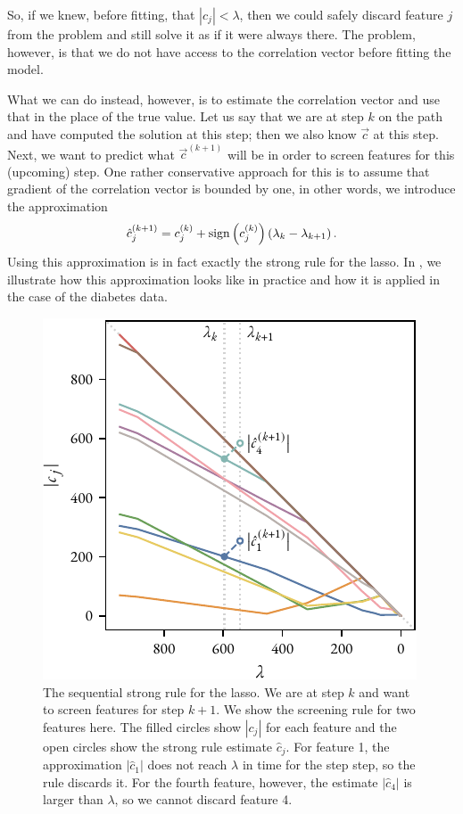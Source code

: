 So, if we knew, before fitting, that \(|c_j| < \lambda\), then we could safely discard feature \(j\) from the problem and still solve it as if it were always there. The problem, however, is that we do not have access to the correlation vector before fitting the model.

What we can do instead, however, is to estimate the correlation vector and use that in the place of the true value. Let us say that we are at step \(k\) on the path and have computed the solution at this step; then we also know \(\vec{c}\) at this step. Next, we want to predict what \(\vec{c}^{(k+1)}\) will be in order to screen features for this (upcoming) step. One rather conservative approach for this is to assume that gradient of the correlation vector is bounded by one, in other words, we introduce the approximation
\[
  \hat{c}_j^{(k+1)} = c_j^{(k)} + \operatorname{sign}\left(c_j^{(k)}\right)\left(\lambda_k - \lambda_{k+1}\right).
\]
Using this approximation is in fact exactly the strong rule for the lasso. In , we illustrate how this approximation looks like in practice and how it is applied in the case of the diabetes data.

\begin{figure}[htpb]
  \centering
  \includegraphics[]{figures/strong-rule.pdf}
  \caption{%
    The sequential strong rule for the lasso. We are at step \(k\) and want to screen features for step \(k+1\). We show the screening rule for two features here. The filled circles show \(|c_j|\) for each feature and the open circles show the strong rule estimate \(\hat{c}_j\). For feature 1, the approximation \(|\hat{c}_1|\) does not reach \(\lambda\) in time for the step step, so the rule discards it. For the fourth feature, however, the estimate \(|\hat{c}_4|\) is larger than \(\lambda\), so we cannot discard feature 4.
  }
  \label{fig:strong-rule}
\end{figure}

